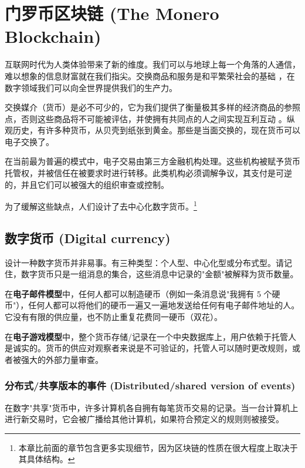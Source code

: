 \chapter{门罗币区块链 (The Monero Blockchain)}
\label{chapter:blockchain}

互联网时代为人类体验带来了新的维度。我们可以与地球上每一个角落的人通信，难以想象的信息财富就在我们指尖。交换商品和服务是和平繁荣社会的基础 \cite{human-action}，在数字领域我们可以向全世界提供我们的生产力。

交换媒介（货币）是必不可少的，它为我们提供了衡量极其多样的经济商品的参照点，否则这些商品将不可能被评估，并使拥有共同点的人之间实现互利互动 \cite{human-action}。纵观历史，有许多种货币，从贝壳到纸张到黄金。那些是当面交换的，现在货币可以电子交换了。

在当前最为普遍的模式中，电子交易由第三方金融机构处理。这些机构被赋予货币托管权，并被信任在被要求时进行转移。此类机构必须调解争议，其支付是可逆的，并且它们可以被强大的组织审查或控制。\cite{Nakamoto_bitcoin}

为了缓解这些缺点，人们设计了去中心化数字货币。\footnote{本章比前面的章节包含更多实现细节，因为区块链的性质在很大程度上取决于其具体结构。}



\section{数字货币 (Digital currency)}
\label{sec:digital-currency}

设计一种数字货币并非易事。有三种类型：个人型、中心化型或分布式型。请记住，数字货币只是一组消息的集合，这些消息中记录的"金额"被解释为货币数量。

在\textbf{电子邮件模型}中，任何人都可以制造硬币（例如一条消息说"我拥有 5 个硬币"），任何人都可以将他们的硬币一遍又一遍地发送给任何有电子邮件地址的人。它没有有限的供应量，也不防止重复花费同一硬币（双花）。

在\textbf{电子游戏模型}中，整个货币存储/记录在一个中央数据库上，用户依赖于托管人是诚实的。货币的供应对观察者来说是不可验证的，托管人可以随时更改规则，或者被强大的外部力量审查。


\subsection{分布式/共享版本的事件 (Distributed/shared version of events)}
\label{subsec:shared-version-events}

在数字"共享"货币中，许多计算机各自拥有每笔货币交易的记录。当一台计算机上进行新交易时，它会被广播给其他计算机，如果符合预定义的规则则被接受。


